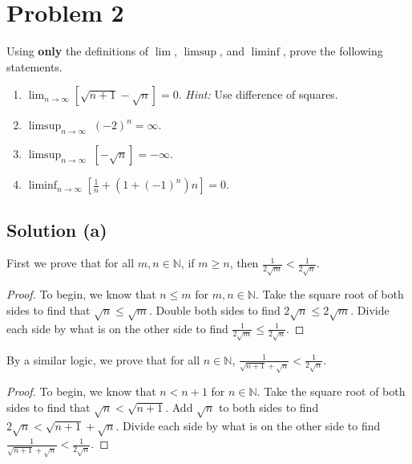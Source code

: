 \documentclass[11pt]{article}
\begin{document}
\section{Problem 2}
    Using \textbf{only} the definitions of $\lim$, $\limsup$, and $\liminf$, prove the following statements.
    \begin{enumerate}[label=(\alph*)]
        \item 
        $\displaystyle{\lim_{n \to \infty} \left[\sqrt{n + 1} - \sqrt{n}\right] = 0}.$ \quad \textit{Hint:} Use difference of squares.

        \item 
        $\displaystyle{\limsup_{n \to \infty} \; (-2)^n = \infty}$.

        \item 
        $\displaystyle{\limsup_{n \to \infty} \; \left[-\sqrt{n}\right]} = -\infty.$
        

        \item 
        $\displaystyle{\liminf_{n \to \infty} \left[\frac{1}{n} + (1 + (-1)^n)n\right] = 0}.$
        
    \end{enumerate}
    \subsection{Solution (a)}
        First we prove that for all $m, n \in \mathbb{N}$, if $m \geq n$, then $\frac{1}{2\sqrt{m}} < \frac{1}{2\sqrt{n}}$.
        \begin{proof}
            To begin, we know that $n \leq m$ for $m, n \in \mathbb{N}$.
            Take the square root of both sides to find that $\sqrt{n} \leq \sqrt{m}$.
            Double both sides to find $2 \sqrt{n} \leq 2 \sqrt{m}$.
            Divide each side by what is on the other side to find $\frac{1}{2 \sqrt{m}} \leq \frac{1}{2 \sqrt{n}}$.
        \end{proof}

        By a similar logic, we prove that for all $n \in \mathbb{N}$, $\frac{1}{\sqrt{n + 1} + \sqrt{n}} < \frac{1}{2\sqrt{n}}$.
        \begin{proof}
            To begin, we know that $n < n + 1$ for $n \in \mathbb{N}$.
            Take the square root of both sides to find that $\sqrt{n} < \sqrt{n + 1}$.
            Add $\sqrt{n}$ to both sides to find $2 \sqrt{n} < \sqrt{n + 1} + \sqrt{n}$.
            Divide each side by what is on the other side to find $\frac{1}{\sqrt{n + 1} + \sqrt{n}} < \frac{1}{2\sqrt{n}}$.
        \end{proof}
\end{document}

